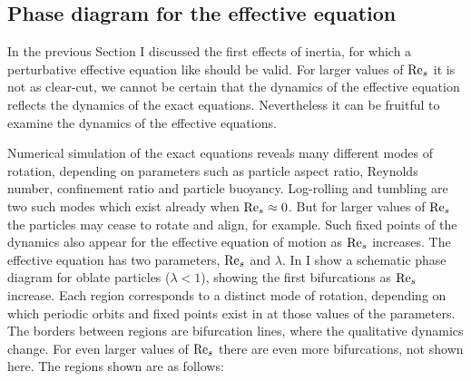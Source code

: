 \documentclass[thesis.tex]{subfiles}
\begin{document}
\subsection*{Phase diagram for the effective equation}
In the previous Section I discussed the first effects of inertia, for which a perturbative effective equation like  should be valid. For larger values of $\textrm{Re}_s$ it is not as clear-cut, we cannot be certain that the dynamics of the effective equation reflects the dynamics of the exact equations. Nevertheless it can be fruitful to examine the dynamics of the effective equations.

Numerical simulation of the exact equations reveals many different modes of rotation, depending on parameters such as particle aspect ratio, Reynolds number, confinement ratio and particle buoyancy. Log-rolling and tumbling are two such modes which exist already when $\textrm{Re}_s\approx0$. But for larger values of $\textrm{Re}_s$ the particles may cease to rotate and align, for example. Such fixed points of the dynamics also appear for the effective equation of motion  as $\textrm{Re}_s$ increases. The effective equation has two parameters, $\textrm{Re}_s$ and $\lambda$. In  I show a schematic phase diagram for oblate particles ($\lambda<1$), showing the first bifurcations as $\textrm{Re}_s$ increase. Each region corresponds to a distinct mode of rotation, depending on which periodic orbits and fixed points exist in  at those values of the parameters. The borders between regions are bifurcation lines, where the qualitative dynamics change. For even larger values of $\textrm{Re}_s$ there are even more bifurcations, not shown here. The regions shown are as follows:
\end{document}
